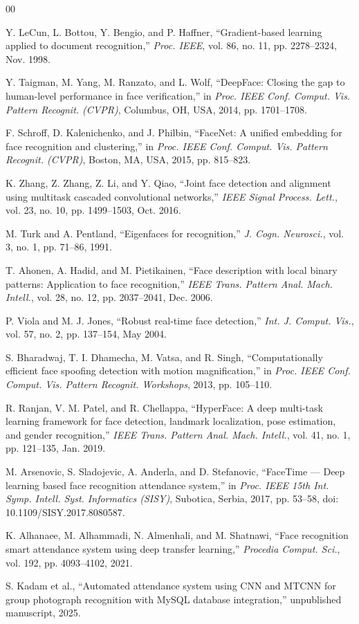 \documentclass[conference]{IEEEtran}
\begin{document}
\begin{thebibliography}{00}

Y. LeCun, L. Bottou, Y. Bengio, and P. Haffner,
``Gradient-based learning applied to document recognition,''
\emph{Proc. IEEE}, vol. 86, no. 11, pp. 2278--2324, Nov. 1998.

Y. Taigman, M. Yang, M. Ranzato, and L. Wolf,
``DeepFace: Closing the gap to human-level performance in face
verification,''
in \emph{Proc. IEEE Conf. Comput. Vis. Pattern Recognit. (CVPR)},
Columbus, OH, USA, 2014, pp. 1701--1708.

F. Schroff, D. Kalenichenko, and J. Philbin,
``FaceNet: A unified embedding for face recognition and clustering,''
in \emph{Proc. IEEE Conf. Comput. Vis. Pattern Recognit. (CVPR)},
Boston, MA, USA, 2015, pp. 815--823.

K. Zhang, Z. Zhang, Z. Li, and Y. Qiao,
``Joint face detection and alignment using multitask cascaded convolutional
networks,''
\emph{IEEE Signal Process. Lett.}, vol. 23, no. 10, pp. 1499--1503,
Oct. 2016.

M. Turk and A. Pentland,
``Eigenfaces for recognition,''
\emph{J. Cogn. Neurosci.}, vol. 3, no. 1, pp. 71--86, 1991.

T. Ahonen, A. Hadid, and M. Pietikainen,
``Face description with local binary patterns: Application to face
recognition,''
\emph{IEEE Trans. Pattern Anal. Mach. Intell.},
vol. 28, no. 12, pp. 2037--2041, Dec. 2006.

P. Viola and M. J. Jones,
``Robust real-time face detection,''
\emph{Int. J. Comput. Vis.}, vol. 57, no. 2, pp. 137--154, May 2004.

S. Bharadwaj, T. I. Dhamecha, M. Vatsa, and R. Singh,
``Computationally efficient face spoofing detection with motion
magnification,''
in \emph{Proc. IEEE Conf. Comput. Vis. Pattern Recognit. Workshops},
2013, pp. 105--110.

R. Ranjan, V. M. Patel, and R. Chellappa,
``HyperFace: A deep multi-task learning framework for face detection,
landmark localization, pose estimation, and gender recognition,''
\emph{IEEE Trans. Pattern Anal. Mach. Intell.},
vol. 41, no. 1, pp. 121--135, Jan. 2019.

M. Arsenovic, S. Sladojevic, A. Anderla, and D. Stefanovic,
``FaceTime --- Deep learning based face recognition attendance system,''
in \emph{Proc. IEEE 15th Int. Symp. Intell. Syst. Informatics (SISY)},
Subotica, Serbia, 2017, pp. 53--58,
doi: 10.1109/SISY.2017.8080587.

K. Alhanaee, M. Alhammadi, N. Almenhali, and M. Shatnawi,
``Face recognition smart attendance system using deep transfer learning,''
\emph{Procedia Comput. Sci.}, vol. 192, pp. 4093--4102, 2021.

S. Kadam et al.,
``Automated attendance system using CNN and MTCNN for group photograph
recognition with MySQL database integration,''
unpublished manuscript, 2025.

\end{thebibliography}
\end{document}
